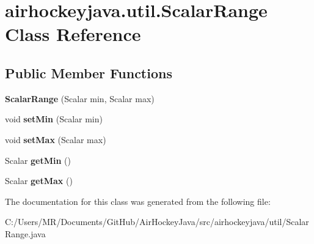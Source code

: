 \hypertarget{classairhockeyjava_1_1util_1_1_scalar_range}{}\section{airhockeyjava.\+util.\+Scalar\+Range Class Reference}
\label{classairhockeyjava_1_1util_1_1_scalar_range}
\subsection*{Public Member Functions}
\begin{DoxyCompactItemize}
\item 
\hypertarget{classairhockeyjava_1_1util_1_1_scalar_range_a53cfbd797bd7c02ff1394b06846ddb8f}{}{\bfseries Scalar\+Range} (Scalar min, Scalar max)\label{classairhockeyjava_1_1util_1_1_scalar_range_a53cfbd797bd7c02ff1394b06846ddb8f}

\item 
\hypertarget{classairhockeyjava_1_1util_1_1_scalar_range_a1c6216b75096fd1831a694b24b579b9a}{}void {\bfseries set\+Min} (Scalar min)\label{classairhockeyjava_1_1util_1_1_scalar_range_a1c6216b75096fd1831a694b24b579b9a}

\item 
\hypertarget{classairhockeyjava_1_1util_1_1_scalar_range_ad6f171ee09991a5da060d2cc8df7a294}{}void {\bfseries set\+Max} (Scalar max)\label{classairhockeyjava_1_1util_1_1_scalar_range_ad6f171ee09991a5da060d2cc8df7a294}

\item 
\hypertarget{classairhockeyjava_1_1util_1_1_scalar_range_a61f29b36f154b7d9db79040b78bf4f42}{}Scalar {\bfseries get\+Min} ()\label{classairhockeyjava_1_1util_1_1_scalar_range_a61f29b36f154b7d9db79040b78bf4f42}

\item 
\hypertarget{classairhockeyjava_1_1util_1_1_scalar_range_a76c7db807d178132cb12e5c66c390a1f}{}Scalar {\bfseries get\+Max} ()\label{classairhockeyjava_1_1util_1_1_scalar_range_a76c7db807d178132cb12e5c66c390a1f}

\end{DoxyCompactItemize}


The documentation for this class was generated from the following file\+:\begin{DoxyCompactItemize}
\item 
C\+:/\+Users/\+M\+R/\+Documents/\+Git\+Hub/\+Air\+Hockey\+Java/src/airhockeyjava/util/Scalar\+Range.\+java\end{DoxyCompactItemize}
